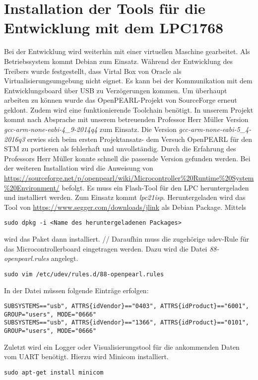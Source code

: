 \chapter{Installation der Tools für die Entwicklung mit dem LPC1768}
Bei der Entwicklung wird weiterhin mit einer virtuellen Maschine gearbeitet. Als Betriebssystem kommt Debian zum Einsatz. Während der Entwicklung des Treibers wurde festgestellt, dass Virtal Box von Oracle als Virtualisierungsumgebung nicht eignet. Es kann bei der Kommunikation mit dem Entwicklungsboard über USB zu Verzögerungen kommen.
Um überhaupt arbeiten zu können wurde das OpenPEARL-Projekt von SourceForge erneut geklont. Zudem wird eine funktionierende Toolchain benötigt. In unserem Projekt kommt nach Absprache mit unserem betreuenden Professor Herr Müller Version {\textit{gcc-arm-none-eabi-4\_9-2014q4}}
 zum Einsatz. 
Die Version {\textit{gcc-arm-none-eabi-5\_4-2016q3}}
 erwies sich beim ersten Projektansatz- dem Versuch OpenPEARL für den STM zu portieren als fehlerhaft und unvollständig. Durch die Erfahrung des Professors Herr Müller konnte schnell die passende Version gefunden werden.
Bei der weiteren Installation wird die Anweisung von \url{https://sourceforge.net/p/openpearl/wiki/Microcontroller%20Runtime%20System%20Environment/} befolgt. Es muss ein Flash-Tool für den LPC heruntergeladen und installiert werden. Zum Einsatz kommt \textit{lpc21isp}. Heruntergeladen wird das Tool von \url{https://www.segger.com/downloads/jlink} als Debian Package. Mittels 
\begin{lstlisting}
sudo dpkg -i <Name des heruntergeladenen Packages>
\end{lstlisting}
wird das Paket dann installiert. //
Daraufhin muss die zugehörige udev-Rule für das Microcontrollerboard eingetragen werden. Dazu wird die Datei \textit{88-openpearl.rules} angelegt.
\begin{lstlisting}
sudo vim /etc/udev/rules.d/88-openpearl.rules
\end{lstlisting}
In der Datei müssen folgende Einträge erfolgen:
\begin{lstlisting}
SUBSYSTEMS=="usb", ATTRS{idVendor}=="0403", ATTRS{idProduct}=="6001", GROUP="users", MODE="0666"
SUBSYSTEMS=="usb", ATTRS{idVendor}=="1366", ATTRS{idProduct}=="0101", GROUP="users", MODE="0666"
\end{lstlisting}
Zuletzt wird ein Logger oder Visualisierungstool für die ankommenden Daten vom UART benötigt. Hierzu wird Minicom installiert.
\begin{lstlisting}
sudo apt-get install minicom
\end{lstlisting}

